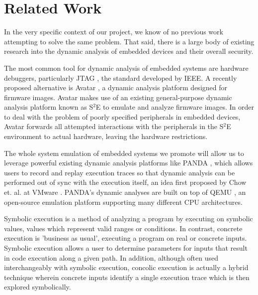 \documentclass[letterpaper, 10 pt, conference]{ieeeconf}
\begin{document}
\section{Related Work} \label{relatedWork}
In the very specific context of our project, we know of no previous work attempting to solve the same problem. That said, there is a large body of existing research into the dynamic analysis of embedded devices and their overall security.

The most common tool for dynamic analysis of embedded systems are hardware debuggers, particularly JTAG \cite{jtag}, the standard developed by IEEE. 
A recently proposed alternative is Avatar \cite{avatar}, a dynamic analysis platform designed for firmware images. Avatar makes use of an existing general-purpose dynamic analysis platform known as S$^2$E \cite{s2e} to emulate and analyze firmware images. In order to deal with the problem of poorly specified peripherals in embedded devices, Avatar forwards all attempted interactions with the peripherals in the S$^2$E environment to actual hardware, leaving the hardware restrictions. 

The whole system emulation of embedded systems we promote will allow us to leverage powerful existing dynamic analysis platforms like PANDA \cite{panda}, which allows users to record and replay execution traces so that dynamic analysis can be performed out of sync with the execution itself, an idea first proposed by Chow et. al. at VMware \cite{jchow}. PANDA's dynamic analyses are built on top of QEMU \cite{qemu}, an open-source emulation platform supporting many different CPU architectures. 

Symbolic execution \cite{jking} is a method of analyzing a program by executing on symbolic values, values which represent valid ranges or conditions. In contrast, concrete execution is 'business as usual', executing a program on real or concrete inputs. Symbolic execution allows a user to determine parameters for inputs that result in code execution along a given path. In addition, although often used interchangeably with symbolic execution, concolic execution \cite{ksen} is actually a hybrid technique wherein concrete inputs identify a single execution trace which is then explored symbolically. 
\end{document}
